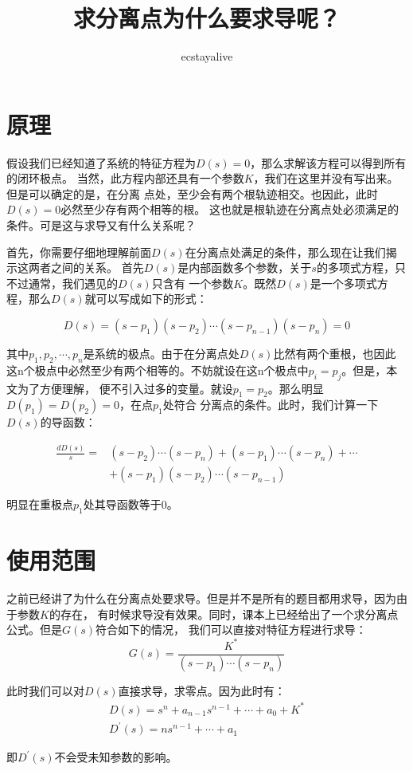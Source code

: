 \documentclass{ctexart}
\begin{document}
\title{求分离点为什么要求导呢？}
\author{ecstayalive}
\maketitle

\section*{原理}

假设我们已经知道了系统的特征方程为$D(s) = 0$，那么求解该方程可以得到所有的闭环极点。
当然，此方程内部还具有一个参数$K$，我们在这里并没有写出来。但是可以确定的是，在分离
点处，至少会有两个根轨迹相交。也因此，此时$D(s) = 0$必然至少存有两个相等的根。
这也就是根轨迹在分离点处必须满足的条件。可是这与求导又有什么关系呢？

首先，你需要仔细地理解前面$D(s)$在分离点处满足的条件，那么现在让我们揭示这两者之间的关系。
首先$D(s)$是内部函数多个参数，关于$s$的多项式方程，只不过通常，我们遇见的$D(s)$只含有
一个参数$K$。既然$D(s)$是一个多项式方程，那么$D(s)$就可以写成如下的形式：

\begin{equation}
    D(s) = (s-p_1)(s-p_2)\cdots(s-p_{n-1})(s-p_n) = 0
\end{equation}

其中$p_1, p_2, \cdots, p_n$是系统的极点。由于在分离点处$D(s)$比然有两个重根，也因此
这n个极点中必然至少有两个相等的。不妨就设在这n个极点中$p_i=p_j$。但是，本文为了方便理解，
便不引入过多的变量。就设$p_1=p_2$。那么明显$D(p_1) = D(p_2) = 0$，在点$p_1$处符合
分离点的条件。此时，我们计算一下$D(s)$的导函数：

\begin{equation}
    \begin{aligned}
        \frac{d D(s)}{s} = & (s-p_2)\cdots(s-p_n) + (s-p_1)\cdots(s-p_n) +\cdots \\
                           & + (s-p_1)(s-p_2)\cdots(s-p_{n-1})
    \end{aligned}
\end{equation}

明显在重极点$p_1$处其导函数等于0。

\section*{使用范围}
之前已经讲了为什么在分离点处要求导。但是并不是所有的题目都用求导，因为由于参数$K$的存在，
有时候求导没有效果。同时，课本上已经给出了一个求分离点公式。但是$G(s)$符合如下的情况，
我们可以直接对特征方程进行求导：
\begin{equation}
    G(s) = \frac{K^*}{(s-p_1)\cdots(s-p_n)}
\end{equation}

此时我们可以对$D(s)$直接求导，求零点。因为此时有：
\begin{gather}
    D(s) = s^n + a_{n-1}s^{n-1} + \cdots + a_0 + K^* \\
    D^{'}(s) =n s^{n-1} + \cdots + a_1
\end{gather}

即$D^{'}(s)$不会受未知参数的影响。
\end{document}
